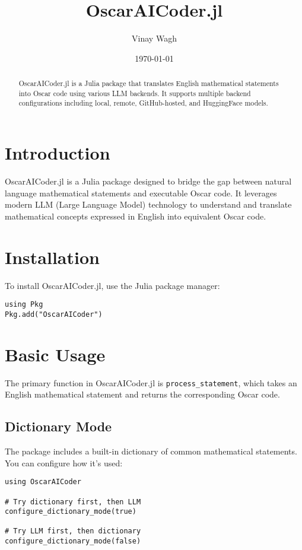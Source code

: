 \documentclass[11pt,a4paper]{article}
\title{\textbf{OscarAICoder.jl}}
\author{Vinay Wagh}
\date{\today}
\begin{document}
\maketitle

\begin{abstract}
OscarAICoder.jl is a Julia package that translates English mathematical statements into Oscar code using various LLM backends. It supports multiple backend configurations including local, remote, GitHub-hosted, and HuggingFace models.
\end{abstract}

\tableofcontents

\section{Introduction}

OscarAICoder.jl is a Julia package designed to bridge the gap between natural language mathematical statements and executable Oscar code. It leverages modern LLM (Large Language Model) technology to understand and translate mathematical concepts expressed in English into equivalent Oscar code.

\section{Installation}

To install OscarAICoder.jl, use the Julia package manager:

\begin{lstlisting}
using Pkg
Pkg.add("OscarAICoder")
\end{lstlisting}

\section{Basic Usage}

The primary function in OscarAICoder.jl is \texttt{process\_statement}, which takes an English mathematical statement and returns the corresponding Oscar code.

\subsection{Dictionary Mode}

The package includes a built-in dictionary of common mathematical statements. You can configure how it's used:

\begin{lstlisting}
using OscarAICoder

# Try dictionary first, then LLM
configure_dictionary_mode(true)

# Try LLM first, then dictionary
configure_dictionary_mode(false)
\end{lstlisting}
\end{document}
